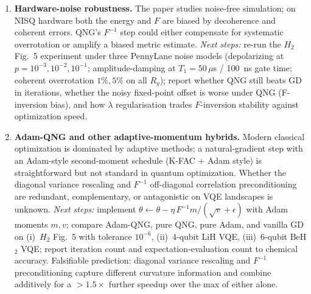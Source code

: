 \begin{enumerate}
  \item \textbf{Hardware-noise robustness.}
    The paper studies noise-free simulation; on NISQ hardware both the energy and $F$ are biased
    by decoherence and coherent errors. QNG's $F^{-1}$ step could either compensate for
    systematic overrotation or amplify a biased metric estimate.
    \emph{Next steps:} re-run the $H_2$ Fig.~5 experiment under three PennyLane noise models
    (depolarizing at $p=10^{-3},10^{-2},10^{-1}$; amplitude-damping at $T_1=50\,\mu$s / 100~ns
    gate time; coherent overrotation $1\%,5\%$ on all $R_y$); report whether QNG still beats GD
    in iterations, whether the noisy fixed-point offset is worse under QNG (F-inversion bias),
    and how $\lambda$ regularisation trades $F$-inversion stability against optimization speed.

  \item \textbf{Adam-QNG and other adaptive-momentum hybrids.}
    Modern classical optimization is dominated by adaptive methods; a natural-gradient step with
    an Adam-style second-moment schedule (K-FAC + Adam style) is straightforward but not
    standard in quantum optimization. Whether the diagonal variance rescaling and $F^{-1}$
    off-diagonal correlation preconditioning are redundant, complementary, or antagonistic on
    VQE landscapes is unknown.
    \emph{Next steps:} implement
    $\theta \leftarrow \theta - \eta\, F^{-1} m / (\sqrt{v}+\epsilon)$
    with Adam moments $m,v$; compare Adam-QNG, pure QNG, pure Adam, and vanilla GD on
    (i)~$H_2$ Fig.~5 with tolerance $10^{-6}$, (ii)~4-qubit LiH VQE, (iii)~6-qubit BeH$_2$ VQE;
    report iteration count and expectation-evaluation count to chemical accuracy. Falsifiable
    prediction: diagonal variance rescaling and $F^{-1}$ preconditioning capture different
    curvature information and combine additively for a $>1.5\times$ further speedup over
    the max of either alone.
\end{enumerate}
